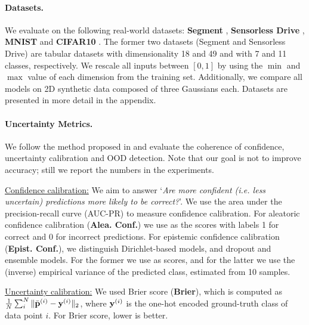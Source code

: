 \paragraph{Datasets.} We evaluate on the following real-world datasets: \textbf{Segment} \cite{uci_datasets}, \textbf{Sensorless Drive} \cite{uci_datasets}, \textbf{MNIST} \cite{mnist} and \textbf{CIFAR10} \cite{cifar10}. The former two datasets (Segment and Sensorless Drive) are tabular datasets with %
dimensionality 18 and 49 and with 7 and 11 classes, respectively. We rescale all inputs between $[0, 1]$ by using the $\min$ and $\max$ value of each dimension from the training set. Additionally, we compare all models on 2D synthetic data composed of three Gaussians each. Datasets are presented in  more detail in the appendix.

\paragraph{Uncertainty Metrics.} We follow the method proposed in \cite{uncertainty_survey} and evaluate the coherence of confidence, uncertainty calibration and OOD detection. Note that our goal is not to improve accuracy; still we report the numbers in the experiments.

\underline{Confidence calibration:} We aim to answer `\textit{Are more confident (i.e. less uncertain) predictions more likely to be correct?}'. We use the area under the precision-recall curve (AUC-PR) to measure confidence calibration. For aleatoric confidence calibration (\textbf{Alea. Conf.}) we use  as the scores with labels 1 for correct and 0 for incorrect predictions. For epistemic confidence calibration (\textbf{Epist. Conf.}), we distinguish Dirichlet-based models, and dropout and ensemble models. For the former we use \smash{$\underset{\iclass}{\max}\; \bm{\alpha}_\iclass\dataix$} as scores, and for the latter we use the (inverse) empirical variance  of the predicted class, estimated from 10 samples.

\underline{Uncertainty calibration:} We used Brier score (\textbf{Brier}), which is computed as $\frac{1}{N}\sum_{i}^N \|\bar{\mathbf{p}}^{(i)} - \mathbf{y}^{(i)}\|_2$, where $\mathbf{y}^{(i)}$ is the one-hot encoded ground-truth class of data point $i$. For Brier score, lower is better.

